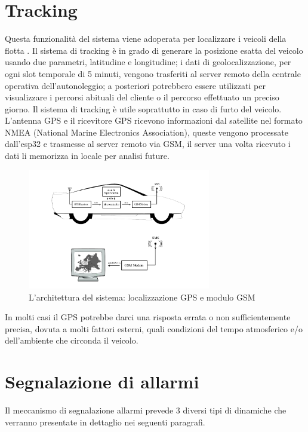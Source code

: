 \documentclass[12pt, a4paper, italian]{report}
\numberwithin{figure}{chapter}
\numberwithin{table}{chapter}
\begin{document}
\section{Tracking}
Questa funzionalità del sistema viene adoperata per localizzare i veicoli della flotta \cite{al2012hybrid}. Il sistema di tracking è in grado di generare la posizione esatta del veicolo usando due parametri, latitudine e longitudine; i dati di geolocalizzazione, per ogni slot temporale di 5 minuti, vengono trasferiti al server remoto della centrale operativa dell'autonoleggio; a posteriori potrebbero essere utilizzati per visualizzare i percorsi abituali del cliente o il percorso effettuato un preciso giorno. Il sistema di tracking è utile soprattutto in caso di furto del veicolo.
L'antenna GPS e il ricevitore GPS ricevono informazioni dal satellite nel formato NMEA (National Marine Electronics Association), queste vengono processate dall'esp32 e trasmesse al server remoto via GSM, il server una volta ricevuto i dati li memorizza in locale per analisi future. 

\begin{figure}[h] \centering
\includegraphics[width=8cm]{tracking.png}
\caption{L'architettura del sistema: localizzazione GPS e modulo GSM\protect\footnotemark}
\label{fig:trackingGPS}
\end{figure}

In molti casi il GPS potrebbe darci una risposta errata o non sufficientemente precisa, dovuta a molti fattori esterni, quali condizioni del tempo atmosferico e/o dell'ambiente che circonda il veicolo.

\section{Segnalazione di allarmi}
Il meccanismo di segnalazione allarmi prevede 3 diversi tipi di dinamiche che verranno presentate in dettaglio nei seguenti paragrafi. 
\end{document}
